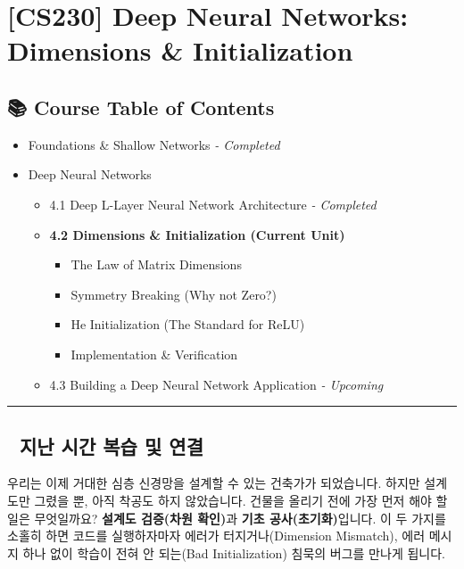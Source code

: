 \documentclass[11pt,a4paper]{book}
\theoremstyle{definition}
\begin{document}
\chapter{[CS230] Deep Neural Networks: \\ Dimensions \& Initialization}
\label{ch:lecture10}

\section*{📚 Course Table of Contents}
\begin{itemize}
    \item[Chapter 1-3.] Foundations \& Shallow Networks \textit{- Completed}
    \item[Chapter 4.] Deep Neural Networks
    \begin{itemize}
        \item 4.1 Deep L-Layer Neural Network Architecture \textit{- Completed}
        \item \textbf{4.2 Dimensions \& Initialization (Current Unit)}
        \begin{itemize}
            \item The Law of Matrix Dimensions
            \item Symmetry Breaking (Why not Zero?)
            \item He Initialization (The Standard for ReLU)
            \item Implementation \& Verification
        \end{itemize}
        \item 4.3 Building a Deep Neural Network Application \textit{- Upcoming}
    \end{itemize}
\end{itemize}

\vspace{0.5cm}
\hrule
\vspace{0.5cm}

\section*{🔗 지난 시간 복습 및 연결}
우리는 이제 거대한 심층 신경망을 설계할 수 있는 건축가가 되었습니다. 하지만 설계도만 그렸을 뿐, 아직 착공도 하지 않았습니다.
건물을 올리기 전에 가장 먼저 해야 할 일은 무엇일까요? \textbf{설계도 검증(차원 확인)}과 \textbf{기초 공사(초기화)}입니다. 이 두 가지를 소홀히 하면 코드를 실행하자마자 에러가 터지거나(Dimension Mismatch), 에러 메시지 하나 없이 학습이 전혀 안 되는(Bad Initialization) 침묵의 버그를 만나게 됩니다.
\end{document}
